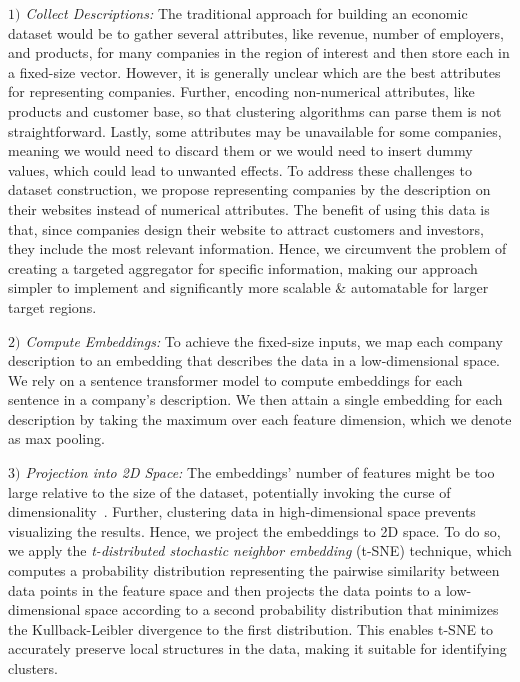 \documentclass[12pt]{article}
\begin{document}
   \textit{$1)$ Collect Descriptions:} The traditional approach for building an economic dataset would be to gather several attributes, like revenue, number of employers, and products, for many companies in the region of interest and then store each in a fixed-size vector. However, it is generally unclear which are the best attributes for representing companies. Further, encoding non-numerical attributes, like products and customer base, so that clustering algorithms can parse them is not straightforward. 
   Lastly, some attributes may be unavailable for some companies, meaning we would need to discard them or we would need to insert dummy values, which could lead to unwanted effects.
   To address these challenges to dataset construction, we propose representing companies by the description on their websites instead of numerical attributes. The benefit of using this data is that, since companies design their website to attract customers and investors, they include the most relevant information. Hence, we circumvent the problem of creating a targeted aggregator for specific information, making our approach simpler to implement and significantly more scalable \& automatable for larger target regions. 
   
   \textit{$2)$ Compute Embeddings:} To achieve the fixed-size inputs, we map each company description to an embedding that describes the data in a low-dimensional space. We rely on a sentence transformer model to compute embeddings for each sentence in a company's description. We then attain a single embedding for each description by taking the maximum over each feature dimension, which we denote as max pooling.
   
   \textit{$3)$ Projection into 2D Space:} The embeddings' number of features might be too large relative to the size of the dataset, potentially invoking the curse of dimensionality~\cite{koppen2000curse}. Further, clustering data in high-dimensional space prevents visualizing the results. Hence, we project the embeddings to 2D space. To do so, we apply the \emph{t-distributed stochastic neighbor embedding} (t-SNE) technique, which computes a probability distribution representing the pairwise similarity between data points in the feature space and then projects the data points to a low-dimensional space according to a second probability distribution that minimizes the Kullback-Leibler divergence to the first distribution. This enables t-SNE to accurately preserve local structures in the data, making it suitable for identifying clusters.
   
\end{document}
